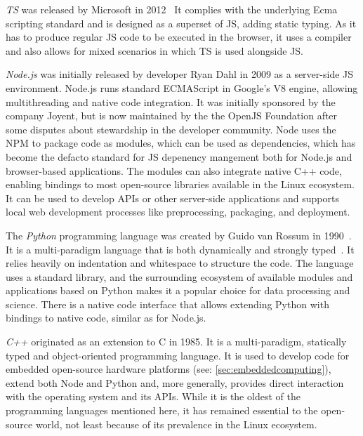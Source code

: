\emph{\ac{TS}} was released by Microsoft in 2012~ It complies with the underlying Ecma scripting standard and is designed as a superset of \ac{JS}, adding static typing.
As it has to produce regular \ac{JS} code to be executed in the browser, it uses a compiler and also allows for mixed scenarios in which \ac{TS} is used alongside \ac{JS}.

\emph{Node.js} was initially released by developer Ryan Dahl in 2009 as a server-side \ac{JS} environment.
Node.js runs standard ECMAScript in Google's V8 engine, allowing multithreading and native code integration.
It was initially sponsored by the company Joyent, but is now maintained by the the OpenJS Foundation after some disputes about stewardship in the developer community.
Node uses the \ac{NPM} to package code as modules, which can be used as dependencies, which has become the defacto standard for \ac{JS} depenency mangement both for Node.js and browser-based applications.
The modules can also integrate native C++ code, enabling bindings to most open-source libraries available in the Linux ecosystem.
It can be used to develop \ac{API}s or other server-side applications and supports local web development processes like preprocessing, packaging, and deployment.

The \emph{Python} programming language was created by Guido van Rossum in 1990~\parencite{pythonHistory}.
It is a multi-paradigm language that is both dynamically and strongly typed~\parencite{pythonTyping}.
It relies heavily on indentation and whitespace to structure the code.
The language uses a standard library, and the surrounding ecosystem of available modules and applications based on Python makes it a popular choice for data processing and science.
There is a native code interface that allows extending Python with bindings to native code, similar as for Node.js.

\emph{C++} originated as an extension to C in 1985.
It is a multi-paradigm, statically typed and object-oriented programming language.
It is used to develop code for embedded open-source hardware platforms (see: \autoref{sec:embeddedcomputing}), extend both Node and Python and, more generally, provides direct interaction with the operating system and its APIs.
While it is the oldest of the programming languages mentioned here, it has remained essential to the open-source world, not least because of its prevalence in the Linux ecosystem.

